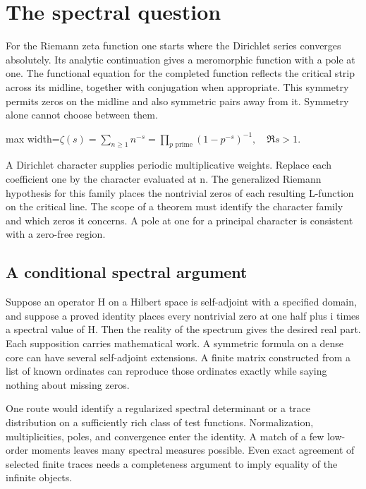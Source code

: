 \documentclass[11pt,oneside,openany]{book}
\begin{document}
\chapter{The spectral question}
For the Riemann zeta function one starts where the Dirichlet series converges absolutely. Its analytic continuation gives a meromorphic function with a pole at one. The functional equation for the completed function reflects the critical strip across its midline, together with conjugation when appropriate. This symmetry permits zeros on the midline and also symmetric pairs away from it. Symmetry alone cannot choose between them.

\begin{center}\begin{adjustbox}{max width=\linewidth}$\displaystyle \zeta(s)=\sum_{n\ge1}n^{-s}=\prod_{p\text{ prime}}(1-p^{-s})^{-1},\quad \Re s>1.$\end{adjustbox}\end{center}
A Dirichlet character supplies periodic multiplicative weights. Replace each coefficient one by the character evaluated at n. The generalized Riemann hypothesis for this family places the nontrivial zeros of each resulting L-function on the critical line. The scope of a theorem must identify the character family and which zeros it concerns. A pole at one for a principal character is consistent with a zero-free region.

\section*{A conditional spectral argument}
Suppose an operator H on a Hilbert space is self-adjoint with a specified domain, and suppose a proved identity places every nontrivial zero at one half plus i times a spectral value of H. Then the reality of the spectrum gives the desired real part. Each supposition carries mathematical work. A symmetric formula on a dense core can have several self-adjoint extensions. A finite matrix constructed from a list of known ordinates can reproduce those ordinates exactly while saying nothing about missing zeros.

One route would identify a regularized spectral determinant or a trace distribution on a sufficiently rich class of test functions. Normalization, multiplicities, poles, and convergence enter the identity. A match of a few low-order moments leaves many spectral measures possible. Even exact agreement of selected finite traces needs a completeness argument to imply equality of the infinite objects.
\end{document}
